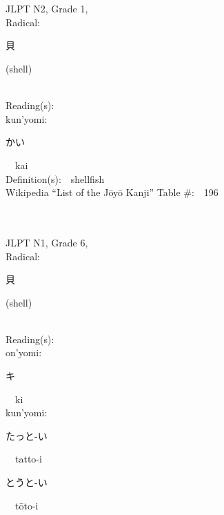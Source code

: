 \begin{multicols}{2}
\ \ \\
{\fontsize{34pt}{40pt}  }\ \ \\  %
{JLPT N2, Grade 1, \\Radical:\ \ {\begin{CJK}{UTF8}{min} 貝 \end{CJK}} (shell) } \\
Reading(s):\ \ \\
{\hspace*{1em}}kun'yomi:\ \ \\
{\hspace*{2em}}{\begin{CJK}{UTF8}{min} かい \end{CJK}}\ \ kai\ \ \\
Definition(s):\ \ shellfish \\
Wikipedia ``List of the J\=oy\=o Kanji'' Table \#:\ \ 196 \\
\ \ \\
{\fontsize{34pt}{40pt}  }\ \ \\  %
{JLPT N1, Grade 6, \\Radical:\ \ {\begin{CJK}{UTF8}{min} 貝 \end{CJK}} (shell) } \\
Reading(s):\ \ \\
{\hspace*{1em}}on'yomi:\ \ \\
{\hspace*{2em}}{\begin{CJK}{UTF8}{min} キ \end{CJK}}\ \ ki\ \ \\
{\hspace*{1em}}kun'yomi:\ \ \\
{\hspace*{2em}}{\begin{CJK}{UTF8}{min} たっと-い \end{CJK}}\ \ tatto-i\ \ \\
{\hspace*{2em}}{\begin{CJK}{UTF8}{min} とうと-い \end{CJK}}\ \ t\=oto-i\ \ \\

\end{multicols}
